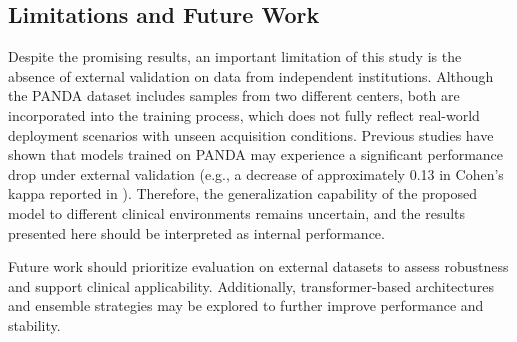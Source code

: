 \subsection{Limitations and Future Work}

Despite the promising results, an important limitation of this study is the absence of external validation on data from independent institutions. Although the PANDA dataset includes samples from two different centers, both are incorporated into the training process, which does not fully reflect real-world deployment scenarios with unseen acquisition conditions. Previous studies have shown that models trained on PANDA may experience a significant performance drop under external validation (e.g., a decrease of approximately 0.13 in Cohen’s kappa reported in \cite{Xiang2023Prostate}). Therefore, the generalization capability of the proposed model to different clinical environments remains uncertain, and the results presented here should be interpreted as internal performance.

Future work should prioritize evaluation on external datasets to assess robustness and support clinical applicability. Additionally, transformer-based architectures and ensemble strategies may be explored to further improve performance and stability.